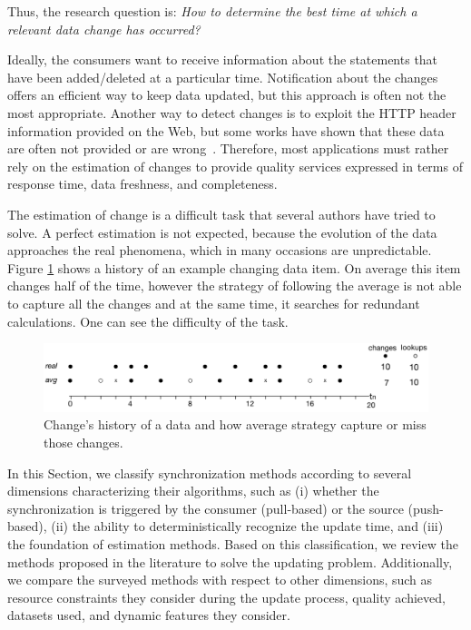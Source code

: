 \documentclass[sw]{iosart2x}
\begin{document}
Thus, the research question is: \textit{How to determine the best time at which a relevant data change has occurred?}

Ideally, the consumers want to receive information about the statements that have been added/deleted at a particular time. Notification about the changes offers an efficient way to keep data updated, but this approach is often not the most appropriate. Another way to detect changes is to exploit the HTTP header information provided on the Web, but some works have shown that these data are often not provided or are wrong~\cite{UmbrichHHPD10, DividinoKG14, Kjernsmo15, NeumaierU16}. Therefore, most applications must rather rely on the estimation of changes to provide quality services expressed in terms of response time, data freshness, and completeness.

The estimation of change is a difficult task that several authors have tried to solve. A perfect estimation is not expected, because the evolution of the data approaches the real phenomena, which in many occasions are unpredictable. Figure \ref{fig:syn} shows a history of an example changing data item. On average this item changes half of the time, however the strategy of following the average is not able to capture all the changes and at the same time, it searches for redundant calculations. One can see the difficulty of the task.

\begin{figure}[h]
	\centering
	\includegraphics[width=1\linewidth]{img/syn.pdf}
	\caption{Change's history of a data and how average strategy capture or miss those changes.}
	\label{fig:syn}
\end{figure}

In this Section, we classify synchronization methods according to several dimensions characterizing their algorithms, such as (i) whether the synchronization is triggered by the consumer (pull-based) or the source (push-based), (ii) the ability to deterministically recognize the update time, and (iii) the foundation of estimation methods. Based on this classification, we review the methods proposed in the literature to solve the updating problem. Additionally, we compare the surveyed methods with respect to other dimensions, such as resource constraints they consider during the update process, quality achieved, datasets used, and dynamic features they consider.
\end{document}
